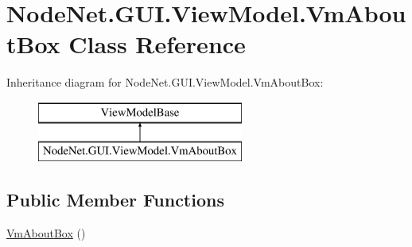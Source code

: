 \hypertarget{class_node_net_1_1_g_u_i_1_1_view_model_1_1_vm_about_box}{}\section{Node\+Net.\+G\+U\+I.\+View\+Model.\+Vm\+About\+Box Class Reference}
\label{class_node_net_1_1_g_u_i_1_1_view_model_1_1_vm_about_box}
Inheritance diagram for Node\+Net.\+G\+U\+I.\+View\+Model.\+Vm\+About\+Box\+:\begin{figure}[H]
\begin{center}
\leavevmode
\includegraphics[height=2.000000cm]{class_node_net_1_1_g_u_i_1_1_view_model_1_1_vm_about_box}
\end{center}
\end{figure}
\subsection*{Public Member Functions}
\begin{DoxyCompactItemize}
\item 
\hyperlink{class_node_net_1_1_g_u_i_1_1_view_model_1_1_vm_about_box_a51748f753bb2dcff53bf01316d5b41f7}{Vm\+About\+Box} ()
\end{DoxyCompactItemize}
